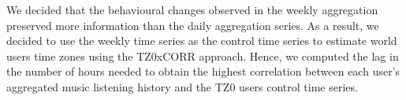 We decided that the behavioural changes observed in the weekly aggregation preserved more information than the daily aggregation series. As a result, we decided to use the weekly time series as the control time series to estimate world users time zones using the TZ0xCORR approach.
Hence, we computed the lag in the number of hours needed to obtain the highest correlation between each user's aggregated music listening history and the TZ0 users control time series. 










